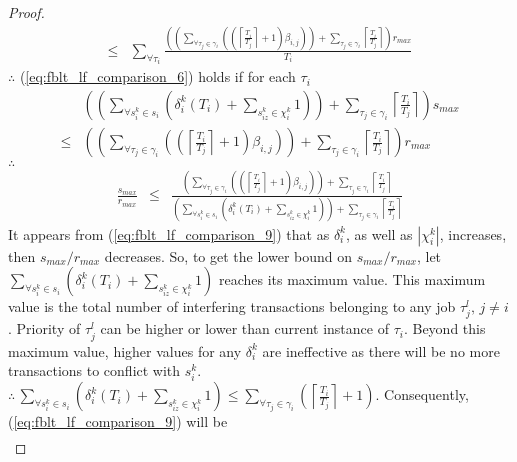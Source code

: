 \documentclass[12pt,english]{report}
\newtheorem{proof}{Proof}
\begin{document}
\begin{proof}
\begin{eqnarray}
\le & \sum_{\forall\tau_{i}}\frac{\left(\left(\sum_{\forall\tau_{j}\in\gamma_{i}}\left(\left(\left\lceil \frac{T_{i}}{T_{j}}\right\rceil +1\right)\beta_{i,j}\right)\right)+\sum_{\tau_{j}\in\gamma_{i}}\left\lceil \frac{T_{i}}{T_{j}}\right\rceil \right)r_{max}}{T_{i}}\nonumber 
\end{eqnarray}
$\therefore$ (\ref{eq:fblt_lf_comparison_6}) holds if for each $\tau_{i}$
\begin{eqnarray}
 & \left(\left(\sum_{\forall s_{i}^{k}\in s_{i}}\left(\delta_{i}^{k}(T_{i})+\sum_{s_{iz}^{k}\in\chi_{i}^{k}}1\right)\right)+\sum_{\tau_{j}\in\gamma_{i}}\left\lceil \frac{T_{i}}{T_{j}}\right\rceil \right)s_{max}\label{eq:fblt_lf_comparison_7}\\
\le & \left(\left(\sum_{\forall\tau_{j}\in\gamma_{i}}\left(\left(\left\lceil \frac{T_{i}}{T_{j}}\right\rceil +1\right)\beta_{i,j}\right)\right)+\sum_{\tau_{j}\in\gamma_{i}}\left\lceil \frac{T_{i}}{T_{j}}\right\rceil \right)r_{max}\nonumber 
\end{eqnarray}
$\therefore$
\begin{eqnarray}
\frac{s_{max}}{r_{max}} & \le & \frac{\left(\sum_{\forall\tau_{j}\in\gamma_{i}}\left(\left(\left\lceil \frac{T_{i}}{T_{j}}\right\rceil +1\right)\beta_{i,j}\right)\right)+\sum_{\tau_{j}\in\gamma_{i}}\left\lceil \frac{T_{i}}{T_{j}}\right\rceil }{\left(\sum_{\forall s_{i}^{k}\in s_{i}}\left(\delta_{i}^{k}(T_{i})+\sum_{s_{iz}^{k}\in\chi_{i}^{k}}1\right)\right)+\sum_{\tau_{j}\in\gamma_{i}}\left\lceil \frac{T_{i}}{T_{j}}\right\rceil }\label{eq:fblt_lf_comparison_9}
\end{eqnarray}
It appears from (\ref{eq:fblt_lf_comparison_9}) that as $\delta_{i}^{k}$,
as well as $|\chi_{i}^{k}|$, increases, then $s_{max}/r_{max}$ decreases.
So, to get the lower bound on $s_{max}/r_{max}$, let $\sum_{\forall s_{i}^{k}\in s_{i}}\left(\delta_{i}^{k}(T_{i})+\sum_{s_{iz}^{k}\in\chi_{i}^{k}}1\right)$
reaches its maximum value. This maximum value is the total number
of interfering transactions belonging to any job $\tau_{j}^{l},\, j\ne i$.
Priority of $\tau_{j}^{l}$ can be higher or lower than current instance
of $\tau_{i}$. Beyond this maximum value, higher values for any $\delta_{i}^{k}$
are ineffective as there will be no more transactions to conflict
with $s_{i}^{k}$. $\therefore\,\sum_{\forall s_{i}^{k}\in s_{i}}\left(\delta_{i}^{k}(T_{i})+\sum_{s_{iz}^{k}\in\chi_{i}^{k}}1\right)\le\sum_{\forall\tau_{j}\in\gamma_{i}}\left(\left\lceil \frac{T_{i}}{T_{j}}\right\rceil +1\right)$.
Consequently, (\ref{eq:fblt_lf_comparison_9}) will be 
\begin{eqnarray}

\end{eqnarray}
\end{proof}
\end{document}
